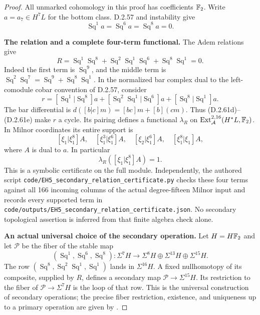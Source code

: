 \begin{proof}
All unmarked cohomology in this proof has coefficients
$\mathbb F_2$.  Write $a=a_7\in H^7L$ for the bottom class.
D.2.57 and instability give
\[
       \operatorname{Sq}^1a=\operatorname{Sq}^6a
                         =\operatorname{Sq}^8a=0.
       \tag{D.2.61d}
\]

\medskip\noindent
\textbf{The relation and a complete four-term functional.}
The Adem relations give
\[
 R=\operatorname{Sq}^1\operatorname{Sq}^8
   +\operatorname{Sq}^2\operatorname{Sq}^1\operatorname{Sq}^6
   +\operatorname{Sq}^8\operatorname{Sq}^1=0.
   \tag{D.2.61e}
\]
Indeed the first term is $\operatorname{Sq}^9$, and the
middle term is
$\operatorname{Sq}^2\operatorname{Sq}^7
 =\operatorname{Sq}^9+\operatorname{Sq}^8\operatorname{Sq}^1$.
In the normalized bar complex dual to the left-comodule
cobar convention of D.2.57, consider
\[
 r=[\operatorname{Sq}^1|\operatorname{Sq}^8]a
  +[\operatorname{Sq}^2\operatorname{Sq}^1|
                                  \operatorname{Sq}^6]a
  +[\operatorname{Sq}^8|\operatorname{Sq}^1]a.
  \tag{D.2.61f}
\]
The bar differential is
$d([b|c]m)=[bc]m+[b](cm)$.
Thus \textup{(D.2.61d)--(D.2.61e)} make $r$ a cycle.
Its pairing defines a functional $\lambda_R$ on
$\operatorname{Ext}_{\mathcal A}^{2,16}(H^*L,\mathbb F_2)$.
In Milnor coordinates its entire support is
\[
 [\xi_1|\xi_1^8]A,\quad
 [\xi_1^3|\xi_1^6]A,\quad
 [\xi_2|\xi_1^6]A,\quad
 [\xi_1^8|\xi_1]A,
 \tag{D.2.61g}
\]
where $A$ is dual to $a$.  In particular
\[
              \lambda_R([\xi_1|\xi_1^8]A)=1.
              \tag{D.2.61h}
\]
This is a symbolic certificate on the full module.
Independently, the authored script
\texttt{code/EH5\_secondary\_relation\_certificate.py}
checks these four terms against all 166 incoming columns
of the actual degree-fifteen Milnor input and records
every supported term in
\texttt{code/outputs/EH5\_secondary\_relation\_certificate.json}.
No secondary topological assertion is inferred from that
finite algebra check alone.

\medskip\noindent
\textbf{An actual universal choice of the secondary operation.}
Let $H=H\mathbb F_2$ and let $\mathcal P$ be the fiber of the
stable map
\[
 (\operatorname{Sq}^1,\operatorname{Sq}^6,\operatorname{Sq}^8):
 \Sigma^7H\longrightarrow
           \Sigma^8H\oplus\Sigma^{13}H\oplus\Sigma^{15}H.
 \tag{D.2.61i}
\]
The row
$(\operatorname{Sq}^8,\operatorname{Sq}^2\operatorname{Sq}^1,
\operatorname{Sq}^1)$ lands in $\Sigma^{16}H$.
A fixed nullhomotopy of its composite, supplied by $R$,
defines a secondary map $\mathcal P\to\Sigma^{15}H$.
Its restriction to the fiber of
$\mathcal P\to\Sigma^7H$ is the loop of that row.
This is the universal construction of secondary operations;
the precise fiber restriction, existence, and uniqueness
up to a primary operation are given by
\cite[Section~3.6, especially Theorems~3.6.1--3.6.2 and
Lemma~3.6.3, pp.~68--74]{EH5Adams1960Secondary}.


\end{proof}
